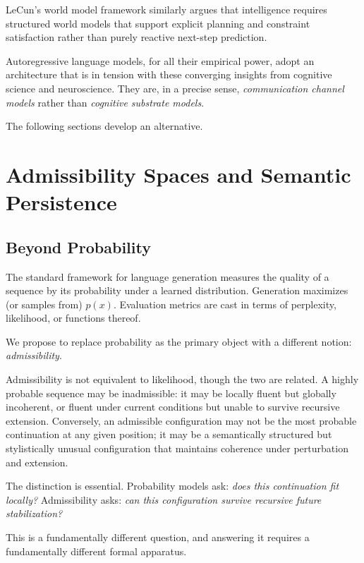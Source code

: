 \documentclass[11pt, a4paper]{article}
\theoremstyle{srn}
\theoremstyle{srnremark}
\begin{document}
LeCun's world model framework \citep{lecun2022path} similarly
argues that intelligence requires structured world models that support
explicit planning and constraint satisfaction rather than purely
reactive next-step prediction.

Autoregressive language models, for all their empirical power, adopt
an architecture that is in tension with these converging insights from
cognitive science and neuroscience.
They are, in a precise sense, \emph{communication channel models}
rather than \emph{cognitive substrate models}.

The following sections develop an alternative.

\section{Admissibility Spaces and Semantic Persistence}
\label{sec:admissibility}

\subsection{Beyond Probability}

The standard framework for language generation measures the quality of
a sequence by its probability under a learned distribution.
Generation maximizes (or samples from) $p(x)$.
Evaluation metrics are cast in terms of perplexity, likelihood, or
functions thereof.

We propose to replace probability as the primary object with a
different notion: \emph{admissibility}.

Admissibility is not equivalent to likelihood, though the two are
related.
A highly probable sequence may be inadmissible: it may be locally
fluent but globally incoherent, or fluent under current conditions but
unable to survive recursive extension.
Conversely, an admissible configuration may not be the most probable
continuation at any given position; it may be a semantically
structured but stylistically unusual configuration that maintains
coherence under perturbation and extension.

The distinction is essential.
Probability models ask: \emph{does this continuation fit locally?}
Admissibility asks: \emph{can this configuration survive recursive
future stabilization?}

This is a fundamentally different question, and answering it requires
a fundamentally different formal apparatus.
\end{document}
